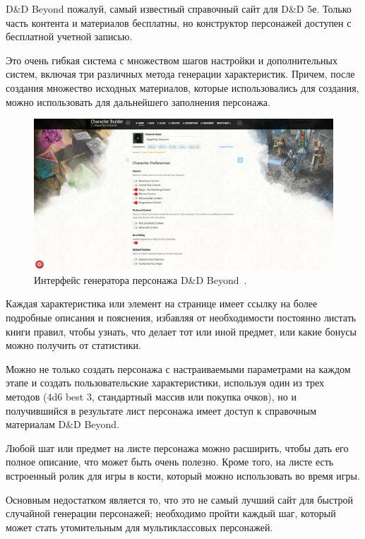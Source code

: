 D\&D Beyond пожалуй, самый известный справочный сайт для D\&D 5е. Только часть контента и материалов бесплатны, но конструктор персонажей доступен с бесплатной учетной записью.

Это очень гибкая система с множеством шагов настройки и дополнительных систем, включая три различных метода генерации характеристик. Причем, после создания множество исходных материалов, которые использовались для создания, можно использовать для дальнейшего заполнения персонажа.

\begin{figure}[H]
    \centering
    \includegraphics[scale=0.3]{DnD_Beyond.png}
    \caption{Интерфейс генератора персонажа D\&D Beyond~\cite{beyond}.}
    \label{fig:beyond}
\end{figure}

Каждая характеристика или элемент на странице имеет ссылку на более подробные описания и пояснения, избавляя от необходимости постоянно листать книги правил, чтобы узнать, что делает тот или иной предмет, или какие бонусы можно получить от статистики.

Можно не только создать персонажа с настраиваемыми параметрами на каждом этапе и создать пользовательские характеристики, используя один из трех методов (4d6 best 3, стандартный массив или покупка очков), но и получившийся в результате лист персонажа имеет доступ к справочным материалам D\&D Beyond. 

Любой шат или предмет на листе персонажа можно расширить, чтобы дать его полное описание, что может быть очень полезно. Кроме того, на листе есть встроенный ролик для игры в кости, который можно использовать во время игры.

Основным недостатком является то, что это не самый лучший сайт для быстрой случайной генерации персонажей; необходимо пройти каждый шаг, который может стать утомительным для мультиклассовых персонажей.

